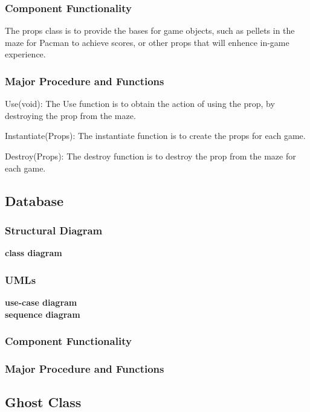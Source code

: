 \documentclass[11pt]{article}
\begin{document}
\subsubsection{Component Functionality}
The props class is to provide the bases for game objects, such as pellets in the maze for Pacman to achieve scores, or other props that will enhence in-game experience.
\subsubsection{Major Procedure and Functions}
Use(void): The Use function is to obtain the action of using the prop, by destroying the prop from the maze.

Instantiate(Props): The instantiate function is to create the props for each game.

Destroy(Props): The destroy function is to destroy the prop from the maze for each game.

\subsection{Database}
\subsubsection{Structural Diagram}
\textbf{class diagram}\\
\subsubsection{UMLs}
\textbf{use-case diagram}\\
\textbf{sequence diagram}\\
\subsubsection{Component Functionality}
\subsubsection{Major Procedure and Functions}


\subsection{Ghost Class}
\end{document}
